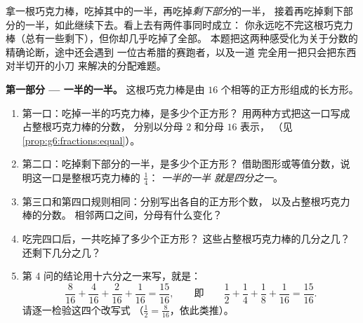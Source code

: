\begin{problem}
\label{pb:g6:fractions:1}
拿一根巧克力棒，吃掉其中的一半，再吃掉\emph{剩下部分}的一半，
接着再吃掉剩下部分的一半，如此继续下去。看上去有两件事同时成立：
你永远吃不完这根巧克力棒（总有一些剩下），但你却几乎吃掉了全部。
本题把这两种感受化为关于分数的精确论断，途中还会遇到
一位古希腊的赛跑者，以及一道
完全用一把只会把东西对半切开的小刀
来解决的分配难题。

\medskip
\noindent\textbf{第一部分 --- 一半的一半。}
这根巧克力棒是由 $16$ 个相等的正方形组成的长方形。
\begin{enumerate}
  \item 第一口：吃掉一半的巧克力棒，是多少个正方形？
        用两种方式把这一口写成占整根巧克力棒的分数，
        分别以分母 $2$ 和分母 $16$ 表示，
        （见\cref{prop:g6:fractions:equal}）。
  \item 第二口：吃掉剩下部分的一半，是多少个正方形？
        借助图形或等值分数，说明这一口是整根巧克力棒的 $\frac14$：
        \emph{一半的一半
        就是四分之一}。
  \item 第三口和第四口规则相同：分别写出各自的正方形个数，
        以及占整根巧克力棒的分数。
        相邻两口之间，分母有什么变化？
  \item 吃完四口后，一共吃掉了多少个正方形？
        这些占整根巧克力棒的几分之几？
        还剩下几分之几？
  \item 第 4 问的结论用十六分之一来写，就是：
        \[
        \frac{8}{16} + \frac{4}{16} + \frac{2}{16} + \frac{1}{16}
        = \frac{15}{16},
        \qquad\text{即}\qquad
        \frac12 + \frac14 + \frac18 + \frac{1}{16}
        = \frac{15}{16} .
        \]
        请逐一检验这四个改写式
        （$\frac12 = \frac{8}{16}$，依此类推）。
\end{enumerate}


\end{problem}

